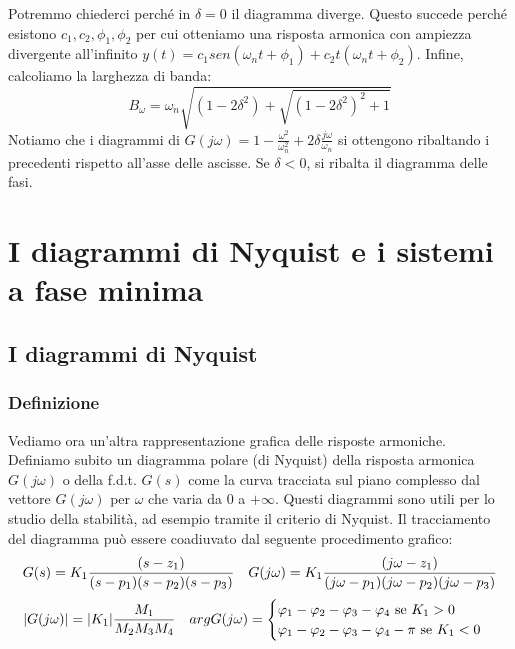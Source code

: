 \documentclass[11pt]{article}
\begin{document}
Potremmo chiederci perché in $\delta=0$ il diagramma diverge. Questo succede perché esistono $c_1,c_2, \phi_1, \phi_2$ per cui otteniamo una risposta armonica con ampiezza divergente all'infinito $y(t)=c_1sen(\omega_nt+\phi_1)+c_2t(\omega_nt+\phi_2)$. Infine, calcoliamo la larghezza di banda:
\begin{displaymath}
    B_\omega = \omega_n\sqrt{(1-2\delta^2)+\sqrt{(1-2\delta^2)^2 +1}}
\end{displaymath}
Notiamo che i diagrammi di $G(j\omega) = 1-\frac{\omega^2}{\omega^2_n}+2\delta\frac{j\omega}{\omega_n}$ si ottengono ribaltando i precedenti rispetto all'asse delle ascisse. Se $\delta<0$, si ribalta il diagramma delle fasi.
\section{I diagrammi di Nyquist e i sistemi a fase minima}
\subsection{I diagrammi di Nyquist}
\subsubsection{Definizione}
Vediamo ora un'altra rappresentazione grafica delle risposte armoniche.
Definiamo subito un diagramma polare (di Nyquist) della risposta armonica $G(j\omega)$ o della f.d.t. $G(s)$ come la curva tracciata sul piano complesso dal vettore $G(j\omega)$ per $\omega$ che varia da $0$ a $+\infty$.
Questi diagrammi sono utili per lo studio della stabilità, ad esempio tramite il criterio di Nyquist. Il tracciamento del diagramma può essere coadiuvato dal seguente procedimento grafico:
\begin{displaymath}
    G(s)=K_1\frac{(s-z_1)}{(s-p_1)(s-p_2)(s-p_3)} \hspace{10px}G(j\omega) = K_1 \frac{(j\omega-z_1)}{(j\omega-p_1)(j\omega-p_2)(j\omega-p_3)}
\end{displaymath}
\begin{displaymath}
    |G(j\omega)| = |K_1|\frac{M_1}{M_2M_3M_4} \hspace{10px}argG(j\omega) = \begin{cases}
        \varphi_1 - \varphi_2 - \varphi_3 - \varphi_4 \textrm{ se }K_1>0 \\
        \varphi_1 - \varphi_2 - \varphi_3 - \varphi_4 - \pi \textrm{ se }K_1<0
    \end{cases}
\end{displaymath}
\end{document}
